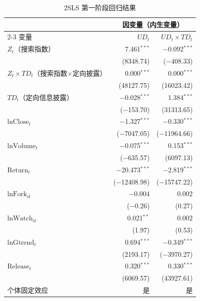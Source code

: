 \documentclass[
    type = master, %
    degree = professional,        %
    decl-page,  %
    twoside,                %
    fontset = fandol %
  ]{njuthesis}
\begin{document}
\begin{table}[htbp]
    \centering
    \caption{2SLS 第一阶段回归结果}
    \label{tab:first-stage}
    \small
    \begin{tabularx}{\textwidth}{Xrr}
        \toprule
        & \multicolumn{2}{c}{因变量（内生变量）} \\
        \cmidrule(lr){2-3}
        变量
            & $UD_t$ & $UD_t \times TD_t$ \\
        \midrule
        $Z_t$（搜索指数）
            & 7.461$^{***}$ & $-$0.092$^{***}$ \\
            & (8348.74) & ($-$408.33) \\[0.4em]
        $Z_t \times TD_t$（搜索指数$\times$定向披露）
            & 0.000$^{***}$ & 0.000$^{***}$ \\
            & (48127.75) & (16023.42) \\[0.4em]
        $TD_t$（定向信息披露）
            & $-$0.028$^{***}$ & 1.384$^{***}$ \\
            & ($-$153.70) & (31313.65) \\[0.4em]
        $\text{lnClose}_t$
            & $-$1.327$^{***}$ & $-$0.330$^{***}$ \\
            & ($-$7047.05) & ($-$11964.66) \\[0.4em]
        $\text{lnVolume}_t$
            & $-$0.075$^{***}$ & 0.153$^{***}$ \\
            & ($-$635.57) & (6097.13) \\[0.4em]
        $\text{Return}_t$
            & $-$20.473$^{***}$ & $-$2.819$^{***}$ \\
            & ($-$12408.98) & ($-$15747.22) \\[0.4em]
        $\text{lnFork}_{it}$
            & $-$0.004 & 0.002 \\
            & ($-$0.26) & (0.27) \\[0.4em]
        $\text{lnWatch}_{it}$
            & 0.021$^{**}$ & 0.002 \\
            & (1.97) & (0.53) \\[0.4em]
        $\text{lnGtrend}_t$
            & 0.694$^{***}$ & $-$0.349$^{***}$ \\
            & (2193.17) & ($-$3970.27) \\[0.4em]
        $\text{Release}_t$
            & 0.320$^{***}$ & 0.330$^{***}$ \\
            & (6069.57) & (43927.61) \\
        \midrule
        个体固定效应 & 是 & 是 \\

\end{tabularx}
\end{table}
\end{document}
